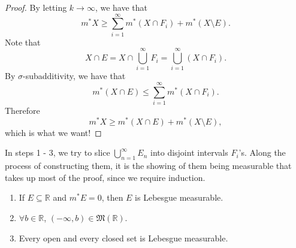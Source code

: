 \documentclass[notoc,notitlepage]{tufte-book}
\begin{document}
\begin{proof}
  By letting $k \to \infty$, we have that
  \begin{equation*}
    m^* X \geq \sum_{i=1}^{\infty} m^* (X \cap F_i) + m^*(X \setminus E).
  \end{equation*}
  Note that
  \begin{equation*}
    X \cap E = X \cap \bigcup_{i=1}^{\infty} F_i = \bigcup_{i=1}^{\infty} (X
    \cap F_i).
  \end{equation*}
  By $\sigma$-subadditivity, we have that
  \begin{equation*}
    m^* ( X \cap E ) \leq \sum_{i=1}^{\infty} m^* (X \cap F_i). 
  \end{equation*}
  Therefore
  \begin{equation*}
    m^* X \geq m^* (X \cap E) + m^*(X \setminus E),
  \end{equation*}
  which is what we want!
\end{proof}

\begin{note}
  In steps 1 - 3, we try to slice $\bigcup_{n=1}^{\infty} E_n$ into disjoint
   intervals $F_i$'s. Along the process of constructing them,
  it is the showing of them being measurable that takes up most of the proof,
  since we require induction.
\end{note}

\begin{propo}\label{propo:some_lebesgue_measurable_sets}
  \begin{enumerate}
    \item If $E \subseteq \mathbb{R}$ and $m^* E = 0$, then $E$ is Lebesgue
      measurable.
    \item $\forall b \in \mathbb{R}$, $(-\infty, b) \in
      \mathfrak{M}(\mathbb{R})$.
    \item Every open and every closed set is Lebesgue measurable.
  \end{enumerate}
\end{propo}
\end{document}
